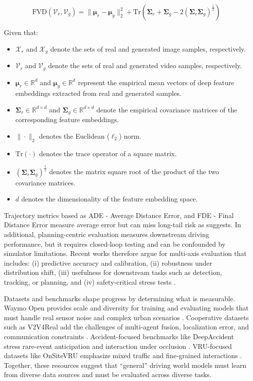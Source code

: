 \begin{equation}
\label{eq:FVD}
\mathrm{FVD}(\mathcal{V}_r, \mathcal{V}_g)
=
\|\boldsymbol{\mu}_r - \boldsymbol{\mu}_g\|_2^2
+
\mathrm{Tr}
\left(
\boldsymbol{\Sigma}_r
+
\boldsymbol{\Sigma}_g
-
2\left(
\boldsymbol{\Sigma}_r \boldsymbol{\Sigma}_g
\right)^{\frac{1}{2}}
\right)
\end{equation}

Given that:
\begin{itemize}
    \item $\mathcal{X}_r$ and $\mathcal{X}_g$ denote the sets of real and generated image samples, respectively.
    \item $\mathcal{V}_r$ and $\mathcal{V}_g$ denote the sets of real and generated video samples, respectively.
    \item $\boldsymbol{\mu}_r \in \mathbb{R}^d$ and $\boldsymbol{\mu}_g \in \mathbb{R}^d$ represent the empirical mean vectors of deep feature embeddings extracted from real and generated samples.
    \item $\boldsymbol{\Sigma}_r \in \mathbb{R}^{d \times d}$ and $\boldsymbol{\Sigma}_g \in \mathbb{R}^{d \times d}$ denote the empirical covariance matrices of the corresponding feature embeddings.
    \item $\|\cdot\|_2$ denotes the Euclidean ($\ell_2$) norm.
    \item $\mathrm{Tr}(\cdot)$ denotes the trace operator of a square matrix.
    \item $(\boldsymbol{\Sigma}_r \boldsymbol{\Sigma}_g)^{\frac{1}{2}}$ denotes the matrix square root of the product of the two covariance matrices.
    \item $d$ denotes the dimensionality of the feature embedding space.
\end{itemize}

Trajectory metrics based as ADE - Average Distance Error, and FDE - Final Distance Error measure average error but can miss long-tail risk as \cite{Caesar2021,Baraldi2025} suggests. In additional, planning-centric evaluation measures downstream driving performance, but it requires closed-loop testing and can be confounded by simulator limitations. Recent works therefore argue for multi-axis evaluation that includes: (i) predictive accuracy and calibration, (ii) robustness under distribution shift, (iii) usefulness for downstream tasks such as detection, tracking, or planning, and (iv) safety-critical stress tests \cite{Caesar2021,Baraldi2025}.

Datasets and benchmarks shape progress by determining what is measurable. Waymo Open provides scale and diversity for training and evaluating models that must handle real sensor noise and complex urban scenarios \cite{Sun2020}. Cooperative datasets such as V2V4Real add the challenges of multi-agent fusion, localization error, and communication constraints \cite{Xu2023}. Accident-focused benchmarks like DeepAccident stress rare-event anticipation and interaction under occlusion \cite{WangDeepAccident2023}. VRU-focused datasets like OnSiteVRU emphasize mixed traffic and fine-grained interactions \cite{Yan2025}. Together, these resources suggest that “general” driving world models must learn from diverse data sources and must be evaluated across diverse tasks.

